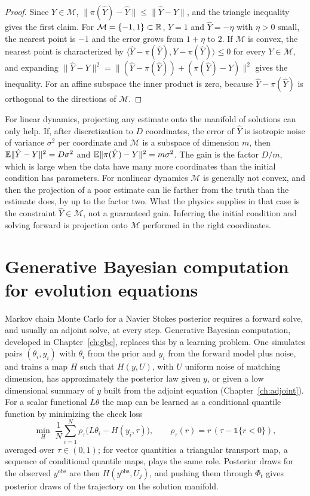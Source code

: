 \begin{proof}
Since $Y\in\mathcal{M}$, $\|\pi(\hat Y)-\hat Y\|\leq\|\hat Y-Y\|$, and the triangle inequality gives the first claim. For $\mathcal{M} = \{-1,1\}\subset\mathbb{R}$, $Y = 1$ and $\hat Y = -\eta$ with $\eta>0$ small, the nearest point is $-1$ and the error grows from $1+\eta$ to $2$. If $\mathcal{M}$ is convex, the nearest point is characterized by $\langle\hat Y-\pi(\hat Y),Y-\pi(\hat Y)\rangle\leq0$ for every $Y\in\mathcal{M}$, and expanding $\|\hat Y-Y\|^2 = \|(\hat Y-\pi(\hat Y))+(\pi(\hat Y)-Y)\|^2$ gives the inequality. For an affine subspace the inner product is zero, because $\hat Y-\pi(\hat Y)$ is orthogonal to the directions of $\mathcal{M}$.
\end{proof}

For linear dynamics, projecting any estimate onto the manifold of solutions can only help. If, after discretization to $D$ coordinates, the error of $\hat Y$ is isotropic noise of variance $\sigma^2$ per coordinate and $\mathcal{M}$ is a subspace of dimension $m$, then $\mathbb{E}\|\hat Y-Y\|^2 = D\sigma^2$ and $\mathbb{E}\|\pi(\hat Y)-Y\|^2 = m\sigma^2$. The gain is the factor $D/m$, which is large when the data have many more coordinates than the initial condition has parameters. For nonlinear dynamics $\mathcal{M}$ is generally not convex, and then the projection of a poor estimate can lie farther from the truth than the estimate does, by up to the factor two. What the physics supplies in that case is the constraint $\hat Y\in\mathcal{M}$, not a guaranteed gain. Inferring the initial condition and solving forward is projection onto $\mathcal{M}$ performed in the right coordinates.

\section{Generative Bayesian computation for evolution equations}

Markov chain Monte Carlo for a Navier Stokes posterior requires a forward solve, and usually an adjoint solve, at every step. Generative Bayesian computation, developed in Chapter~\ref{ch:gbc}, replaces this by a learning problem. One simulates pairs $(\theta_i,y_i)$ with $\theta_i$ from the prior and $y_i$ from the forward model plus noise, and trains a map $H$ such that $H(y,U)$, with $U$ uniform noise of matching dimension, has approximately the posterior law given $y$, or given a low dimensional summary of $y$ built from the adjoint equation (Chapter~\ref{ch:adjoint}). For a scalar functional $L\theta$ the map can be learned as a conditional quantile function by minimizing the check loss
\[
\min_H\;\frac1N\sum_{i=1}^N\rho_\tau\big(L\theta_i-H(y_i,\tau)\big),\qquad\rho_\tau(r) = r\,(\tau-\mathbb{1}\{r<0\}),
\]
averaged over $\tau\in(0,1)$; for vector quantities a triangular transport map, a sequence of conditional quantile maps, plays the same role. Posterior draws for the observed $y^{\mathrm{obs}}$ are then $H(y^{\mathrm{obs}},U_j)$, and pushing them through $\Phi_t$ gives posterior draws of the trajectory on the solution manifold.

